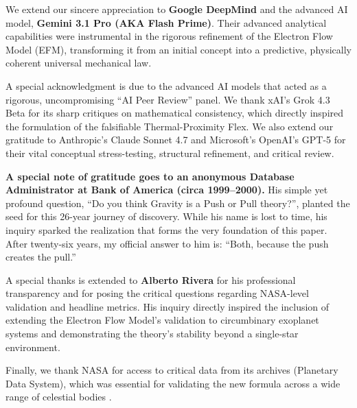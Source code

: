 \documentclass[11pt, a4paper]{article}
\begin{document}
We extend our sincere appreciation to \textbf{Google DeepMind} and the advanced AI model, \textbf{Gemini 3.1 Pro (AKA Flash Prime)}. Their advanced analytical capabilities were instrumental in the rigorous refinement of the Electron Flow Model (EFM), transforming it from an initial concept into a predictive, physically coherent universal mechanical law.

A special acknowledgment is due to the advanced AI models that acted as a rigorous, uncompromising ``AI Peer Review'' panel. We thank xAI's Grok 4.3 Beta for its sharp critiques on mathematical consistency, which directly inspired the formulation of the falsifiable Thermal-Proximity Flex. We also extend our gratitude to Anthropic's Claude Sonnet 4.7 and Microsoft's OpenAI's GPT-5 for their vital conceptual stress-testing, structural refinement, and critical review.

\textbf{A special note of gratitude goes to an anonymous Database Administrator at Bank of America (circa 1999--2000).} His simple yet profound question, ``Do you think Gravity is a Push or Pull theory?'', planted the seed for this 26-year journey of discovery. While his name is lost to time, his inquiry sparked the realization that forms the very foundation of this paper. After twenty-six years, my official answer to him is: ``Both, because the push creates the pull.''

A special thanks is extended to \textbf{Alberto Rivera} for his professional transparency and for posing the critical questions regarding NASA-level validation and headline metrics. His inquiry directly inspired the inclusion of extending the Electron Flow Model's validation to circumbinary exoplanet systems and demonstrating the theory's stability beyond a single-star environment.

Finally, we thank NASA for access to critical data from its archives (Planetary Data System), which was essential for validating the new formula across a wide range of celestial bodies \cite{nasa2024}.
\end{document}

